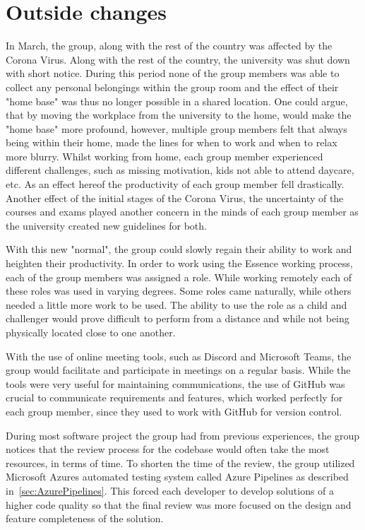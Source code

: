 \section{Outside changes}
In March, the group, along with the rest of the country was affected by the Corona Virus.
Along with the rest of the country, the university was shut down with short notice.
During this period none of the group members was able to collect any personal belongings within the group room and the effect of their "home base" was thus no longer possible in a shared location.
One could argue, that by moving the workplace from the university to the home, would make the "home base" more profound, however, multiple group members felt that always being within their home, made the lines for when to work and when to relax more blurry.
Whilst working from home, each group member experienced different challenges, such as missing motivation, kids not able to attend daycare, etc.
As an effect hereof the productivity of each group member fell drastically.
Another effect of the initial stages of the Corona Virus, the uncertainty of the courses and exams played another concern in the minds of each group member as the university created new guidelines for both.

With this new "normal", the group could slowly regain their ability to work and heighten their productivity.
In order to work using the Essence working process, each of the group members was assigned a role.
While working remotely each of these roles was used in varying degrees.
Some roles came naturally, while others needed a little more work to be used.
The ability to use the role as a child and challenger would prove difficult to perform from a distance and while not being physically located close to one another. 

With the use of online meeting tools, such as Discord and Microsoft Teams, the group would facilitate and participate in meetings on a regular basis.
While the tools were very useful for maintaining communications, the use of GitHub was crucial to communicate requirements and features, which worked perfectly for each group member, since they used to work with GitHub for version control.

During most software project the group had from previous experiences, the group notices that the review process for the codebase would often take the most resources, in terms of time.
To shorten the time of the review, the group utilized Microsoft Azures automated testing system called Azure Pipelines as described in~\autoref{sec:AzurePipelines}.
This forced each developer to develop solutions of a higher code quality so that the final review was more focused on the design and feature completeness of the solution.
